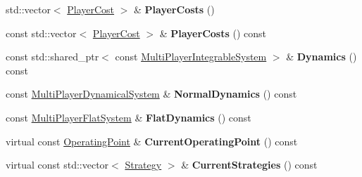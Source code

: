 \begin{DoxyCompactItemize}
\item 
std\+::vector$<$ \hyperlink{classilqgames_1_1_player_cost}{Player\+Cost} $>$ \& {\bfseries Player\+Costs} ()\hypertarget{classilqgames_1_1_problem_ae59a04bdc7c289ef9272dee1e51df892}{}\label{classilqgames_1_1_problem_ae59a04bdc7c289ef9272dee1e51df892}

\item 
const std\+::vector$<$ \hyperlink{classilqgames_1_1_player_cost}{Player\+Cost} $>$ \& {\bfseries Player\+Costs} () const \hypertarget{classilqgames_1_1_problem_aeabbed16991559662d78969f38b2b3cc}{}\label{classilqgames_1_1_problem_aeabbed16991559662d78969f38b2b3cc}

\item 
const std\+::shared\+\_\+ptr$<$ const \hyperlink{classilqgames_1_1_multi_player_integrable_system}{Multi\+Player\+Integrable\+System} $>$ \& {\bfseries Dynamics} () const \hypertarget{classilqgames_1_1_problem_a962651aa1abfb09183d510fec93850d7}{}\label{classilqgames_1_1_problem_a962651aa1abfb09183d510fec93850d7}

\item 
const \hyperlink{classilqgames_1_1_multi_player_dynamical_system}{Multi\+Player\+Dynamical\+System} \& {\bfseries Normal\+Dynamics} () const \hypertarget{classilqgames_1_1_problem_a2c5d9b8b9e0fc7c5b6701b36c56c3de6}{}\label{classilqgames_1_1_problem_a2c5d9b8b9e0fc7c5b6701b36c56c3de6}

\item 
const \hyperlink{classilqgames_1_1_multi_player_flat_system}{Multi\+Player\+Flat\+System} \& {\bfseries Flat\+Dynamics} () const \hypertarget{classilqgames_1_1_problem_ad8156514824a3851eab54c3b85b062fe}{}\label{classilqgames_1_1_problem_ad8156514824a3851eab54c3b85b062fe}

\item 
virtual const \hyperlink{structilqgames_1_1_operating_point}{Operating\+Point} \& {\bfseries Current\+Operating\+Point} () const \hypertarget{classilqgames_1_1_problem_a1ed42bdf388f171c0512ccb9c2beefd5}{}\label{classilqgames_1_1_problem_a1ed42bdf388f171c0512ccb9c2beefd5}

\item 
virtual const std\+::vector$<$ \hyperlink{structilqgames_1_1_strategy}{Strategy} $>$ \& {\bfseries Current\+Strategies} () const \hypertarget{classilqgames_1_1_problem_aa0fdfa634828e45493c41d9961879ee2}{}\label{classilqgames_1_1_problem_aa0fdfa634828e45493c41d9961879ee2}

\end{DoxyCompactItemize}
